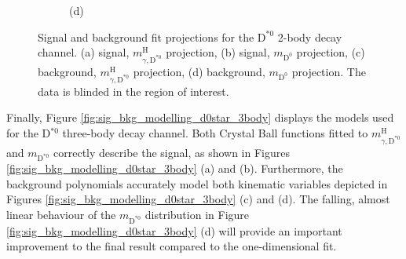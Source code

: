 \begin{figure}[!ht]
\begin{subfigure}[t]{0.50\mylength}
        \vspace*{-0.2cm}
        \caption{\footnotesize (d)}
    \end{subfigure}%
\caption{Signal and background fit projections for the $\text{D}^{*0}$ 2-body decay channel. (a) signal, $m^{\text{H}}_{\gamma, \text{D}^{*0}}$ projection, (b) signal, $m_{\text{D}^{0}}$ projection, (c) background, $m^{\text{H}}_{\gamma, \text{D}^{*0}}$ projection, (d) background, $m_{\text{D}^{0}}$ projection. The data is blinded in the region of interest.}
\label{fig:sig_bkg_modelling_d0star_2body}
    \vspace*{-0.0cm}
\end{figure}

\newpage

Finally, Figure \ref{fig:sig_bkg_modelling_d0star_3body} displays the models used for the D$^{*0}$ three-body decay channel. Both Crystal Ball functions fitted to $m^{\text{H}}_{\gamma, \text{D}^{*0}}$ and $m_{\text{D}^{*0}}$ correctly describe the signal, as shown in Figures \ref{fig:sig_bkg_modelling_d0star_3body} (a) and (b). Furthermore, the background polynomials accurately model both kinematic variables depicted in Figures \ref{fig:sig_bkg_modelling_d0star_3body} (c) and (d). The falling, almost linear behaviour of the $m_{\text{D}^{*0}}$ distribution in Figure \ref{fig:sig_bkg_modelling_d0star_3body} (d) will provide an important improvement to the final result compared to the one-dimensional fit.
